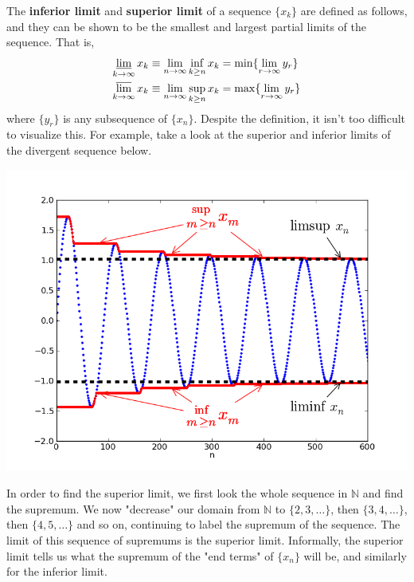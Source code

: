 \documentclass{article}
\begin{document}
      \begin{definition}
        The \textbf{inferior limit} and \textbf{superior limit} of a sequence $\{x_k\}$ are defined as follows, and they can be shown to be the smallest and largest partial limits of the sequence. That is, 
        \begin{align*}
            \varliminf_{k \rightarrow \infty} x_k & \equiv \lim_{n \rightarrow \infty} \inf_{k \geq n}{x_k} = \min\{ \lim_{r \rightarrow \infty} y_r\}\\
            \varlimsup_{k \rightarrow \infty} x_k & \equiv \lim_{n \rightarrow \infty} \sup_{k \geq n}{x_k} = \max\{ \lim_{r \rightarrow \infty} y_r\}
        \end{align*}
        where $\{y_r\}$ is any subsequence of $\{x_n\}$. Despite the definition, it isn't too difficult to visualize this. For example, take a look at the superior and inferior limits of the divergent sequence below.
        \begin{center}
            \includegraphics[scale=0.5]{img/Lim_sup_example.png}
        \end{center}
        In order to find the superior limit, we first look the whole sequence in $\mathbb{N}$ and find the supremum. We now "decrease" our domain from $\mathbb{N}$ to $\{2, 3, \ldots\}$, then $\{3, 4, \ldots\}$, then $\{4, 5, \ldots\}$ and so on, continuing to label the supremum of the sequence. The limit of this sequence of supremums is the superior limit. Informally, the superior limit tells us what the supremum of the "end terms" of $\{x_n\}$ will be, and similarly for the inferior limit. 


\end{definition}
\end{document}
